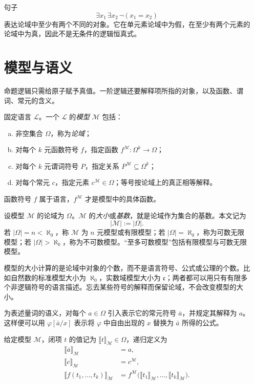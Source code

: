 \documentclass[lang=cn,a4paper,fontset=none,zihao=false,10pt,openany,twoside]{beautybook}
\numberwithin{algorithm}{chapter}
\begin{document}
\begin{example}
句子
\[
 \exists x_1\,\exists x_2\,\neg(x_1=x_2)
\]
表达论域中至少有两个不同的对象。它在单元素论域中为假，在至少有两个元素的论域中为真，因此不是无条件的逻辑恒真式。
\end{example}

\section{模型与语义}\label{sec:fo-models}
命题逻辑只需给原子赋予真值。一阶逻辑还要解释项所指的对象，以及函数、谓词、常元的含义。
\begin{definition}[模型]
固定语言 $\mathcal L$。一个 $\mathcal L$ 的\emph{模型} $\mathcal M$ 包括：
\begin{enumerate}[(a)]
\item 非空集合 $\Omega$，称为\emph{论域}；
\item 对每个 $k$ 元函数符号 $f$，指定函数 $f^{\mathcal M}:\Omega^k\to\Omega$；
\item 对每个 $k$ 元谓词符号 $P$，指定关系 $P^{\mathcal M}\subseteq\Omega^k$；
\item 对每个常元 $c$，指定元素 $c^{\mathcal M}\in\Omega$；等号按论域上的真正相等解释。
\end{enumerate}
\end{definition}
函数符号 $f$ 属于语言，$f^{\mathcal M}$ 才是模型中的具体函数。

\begin{definition}[模型的大小]\label{def:model-cardinality}
设模型 $\mathcal M$ 的论域为 $\Omega$。$\mathcal M$ 的\emph{大小}或\emph{基数}，就是论域作为集合的基数。本文记为
\[
 |\mathcal M|:=|\Omega|.
\]
若 $|\Omega|=n<\aleph_0$，称 $\mathcal M$ 为 $n$ 元模型或有限模型；若 $|\Omega|=\aleph_0$，称为可数无限模型；若 $|\Omega|>\aleph_0$，称为不可数模型。“至多可数模型”包括有限模型与可数无限模型。
\end{definition}
模型的大小计算的是论域中对象的个数，而不是语言符号、公式或公理的个数。比如自然数的标准模型大小为 $\aleph_0$，实数域模型大小为 $\mathfrak c$；两者都可以用只有有限多个非逻辑符号的语言描述。忘去某些符号的解释而保留论域，不会改变模型的大小。


为表述量词的语义，对每个 $a\in\Omega$ 引入表示它的常元符号 $\bar a$，并规定其解释为 $a$。这样便可以用 $\varphi[\bar a/x]$ 表示将 $\varphi$ 中自由出现的 $x$ 替换为 $\bar a$ 所得的公式。

\begin{definition}[项的解释]
给定模型 $\mathcal M$，闭项 $t$ 的值记为 $\llbracket t\rrbracket_{\mathcal M}\in\Omega$，递归定义为
\begin{align*}
 \llbracket\bar a\rrbracket_{\mathcal M}&=a,\\
 \llbracket c\rrbracket_{\mathcal M}&=c^{\mathcal M},\\
 \llbracket f(t_1,\ldots,t_k)\rrbracket_{\mathcal M}
 &=f^{\mathcal M}\bigl(\llbracket t_1\rrbracket_{\mathcal M},\ldots,
                       \llbracket t_k\rrbracket_{\mathcal M}\bigr).
\end{align*}
\end{definition}
\end{document}
